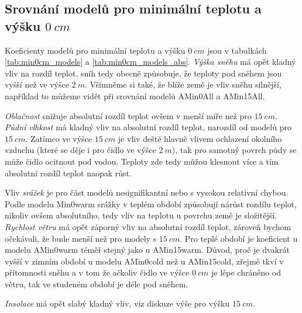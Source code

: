 \subsection{Srovnání modelů pro minimální teplotu a výšku $\SI{0}{cm}$}
Koeficienty modelů pro minimální teplotu a výšku $\SI{0}{cm}$ jsou v tabulkách \ref{tab:min0cm_models} a \ref{tab:min0cm_models_abs}. \textit{Výška sněhu} má opět kladný vliv na rozdíl teplot, sníh tedy obecně způsobuje, že teploty pod sněhem jsou vyšší než ve výšce $\SI{2}{m}$. Všimněme si také, že blíže země je vliv sněhu silnější, například to můžeme vidět při srovnání modelů AMin0All a AMin15All.

\textit{Oblačnost} snižuje absolutní rozdíl teplot ovšem v menší míře než pro $\SI{15}{cm}$. \textit{Půdní vlhkost} má kladný vliv na absolutní rozdíl teplot, narozdíl od modelů pro $\SI{15}{cm}$. Zatímco ve výšce $\SI{15}{cm}$ je vliv deště hlavně vlivem ochlazení okolního vzduchu (které se děje i pro čidlo ve výšce $\SI{2}{m}$), tak pro samotný povrch půdy se může čidlo ocitnout pod vodou. Teploty zde tedy můžou klesnout více a tím absolutní rozdíl teplot naopak růst.

Vliv \textit{srážek} je pro část modelů nesignifikantní nebo s vysokou relativní chybou. Podle modelu Min0warm srážky v teplém období způsobují nárůst rozdílu teplot, nikoliv ovšem absolutního, tedy vliv na teplotu u povrchu země je složitější. \textit{Rychlost větru} má opět záporný vliv na absolutní rozdíl teplot, zároveň bychom očekávali, že bude menší než pro modely s $\SI{15}{cm}$. Pro teplé období je koeficient u modelu AMin0warm téměř stejný jako u AMin15warm. Důvod, proč je dvakrát vyšší v zimním období u modelu AMin0cold než u AMin15cold, zřejmě tkví v přítomnosti sněhu a v tom že ačkoliv čidlo ve výšce $\SI{0}{cm}$ je lépe chráněno od větru, tak ve studeném období je déle pod sněhem. 

\textit{Insolace} má opět slabý kladný vliv, viz diskuze výše pro výšku $\SI{15}{cm}$.

